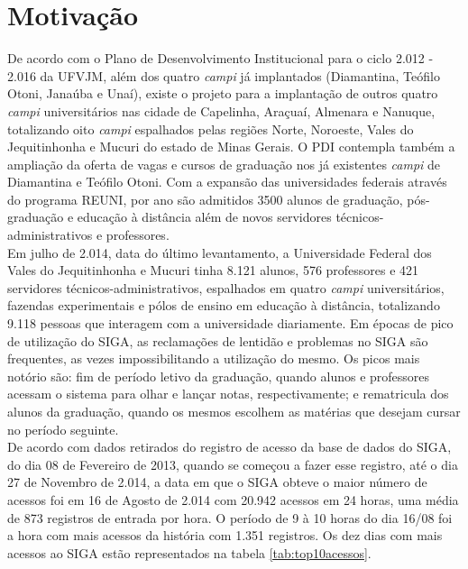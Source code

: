 \section{Motivação}
De acordo com o Plano de Desenvolvimento Institucional para o ciclo 2.012 - 
2.016 da UFVJM, além dos quatro \textit{campi} já implantados (Diamantina, 
Teófilo Otoni, Janaúba e Unaí), existe o projeto para a implantação de outros 
quatro \textit{campi} universitários nas cidade de Capelinha, Araçuaí, Almenara 
e Nanuque, totalizando oito \textit{campi} espalhados pelas regiões Norte, 
Noroeste, Vales do Jequitinhonha e Mucuri do estado de Minas Gerais. O 
PDI contempla também a ampliação da oferta de vagas e cursos de graduação 
nos já existentes \textit{campi} de Diamantina e Teófilo Otoni. Com a expansão 
das universidades federais através do programa REUNI, por ano são admitidos 
3500 alunos de graduação, pós-graduação e educação à distância além de novos 
servidores técnicos-administrativos e professores.\\
Em julho de 2.014, data do último levantamento, a Universidade Federal dos 
Vales do Jequitinhonha e Mucuri tinha 8.121 alunos, 576 professores e 421 
servidores técnicos-administrativos, espalhados em quatro \textit{campi} 
universitários, fazendas experimentais e pólos de ensino em educação à 
distância, totalizando 9.118 pessoas que interagem com a universidade 
diariamente. Em épocas de pico de utilização do SIGA, as reclamações de 
lentidão 
e problemas no SIGA são frequentes, as vezes impossibilitando a utilização do 
mesmo. Os picos mais notório são: fim de período letivo da graduação, quando 
alunos e professores acessam o sistema para olhar e lançar notas, 
respectivamente; e rematricula dos alunos da graduação, quando os mesmos 
escolhem as matérias que desejam cursar no período seguinte.\\
De acordo com dados retirados do registro de acesso da base de dados 
do SIGA, do dia 08 de Fevereiro de 2013, quando se começou a fazer esse 
registro, até o dia 27 de Novembro de 2.014, a data em que o SIGA obteve o 
maior número de acessos foi em 16 de Agosto de 2.014 com 20.942 acessos em 24 
horas, uma média de 873 registros de entrada por hora. O período de 9 à 10 
horas do dia 16/08 foi a hora com mais acessos da história com 1.351 
registros. Os dez dias com mais acessos ao SIGA estão representados na tabela 
\ref{tab:top10acessos}.
